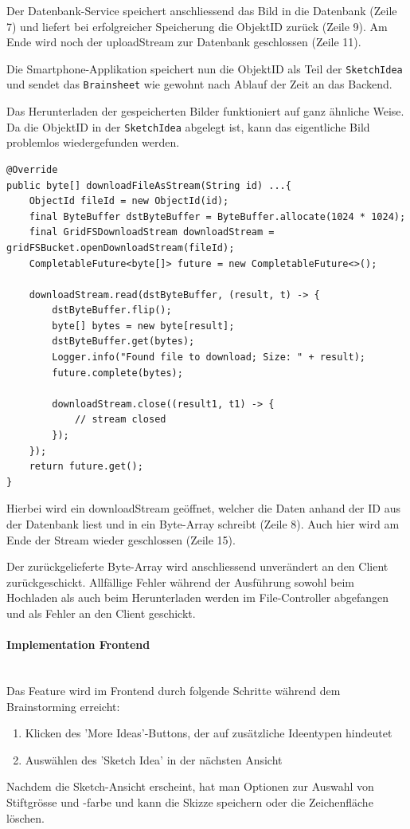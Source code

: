 Der Datenbank-Service speichert anschliessend das Bild in die Datenbank (Zeile 7) und liefert bei erfolgreicher Speicherung die ObjektID zurück (Zeile 9). Am Ende wird noch der uploadStream zur Datenbank geschlossen (Zeile 11).

Die Smartphone-Applikation speichert nun die ObjektID als Teil der \texttt{SketchIdea} und sendet das \texttt{Brainsheet} wie gewohnt nach Ablauf der Zeit an das Backend.

Das Herunterladen der gespeicherten Bilder funktioniert auf ganz ähnliche Weise. Da die ObjektID in der \texttt{SketchIdea} abgelegt ist, kann das eigentliche Bild problemlos wiedergefunden werden.

\begin{lstlisting}[caption={Download File im DB Service}, label=uploadFileDBService]
@Override
public byte[] downloadFileAsStream(String id) ...{
    ObjectId fileId = new ObjectId(id);
    final ByteBuffer dstByteBuffer = ByteBuffer.allocate(1024 * 1024);
    final GridFSDownloadStream downloadStream = gridFSBucket.openDownloadStream(fileId);
    CompletableFuture<byte[]> future = new CompletableFuture<>();

    downloadStream.read(dstByteBuffer, (result, t) -> {
        dstByteBuffer.flip();
        byte[] bytes = new byte[result];
        dstByteBuffer.get(bytes);
        Logger.info("Found file to download; Size: " + result);
        future.complete(bytes);

        downloadStream.close((result1, t1) -> {
            // stream closed
        });
    });
    return future.get();
}
\end{lstlisting}

Hierbei wird ein downloadStream geöffnet, welcher die Daten anhand der ID aus der Datenbank liest und in ein Byte-Array schreibt (Zeile 8). Auch hier wird am Ende der Stream wieder geschlossen (Zeile 15).

Der zurückgelieferte Byte-Array wird anschliessend unverändert an den Client zurück\-geschickt. Allfällige Fehler während der Ausführung sowohl beim Hochladen als auch beim Herunterladen werden im File-Controller abgefangen und als Fehler an den Client geschickt.

\paragraph*{Implementation Frontend}~\\
Das Feature wird im Frontend durch folgende Schritte während dem Brainstorming erreicht:
\begin{enumerate}
	\item Klicken des 'More Ideas'-Buttons, der auf zusätzliche Ideentypen hindeutet
	\item Auswählen des 'Sketch Idea' in der nächsten Ansicht
\end{enumerate}
Nachdem die Sketch-Ansicht erscheint, hat man Optionen zur Auswahl von Stiftgrösse und -farbe und kann die Skizze speichern oder die Zeichenfläche löschen.

